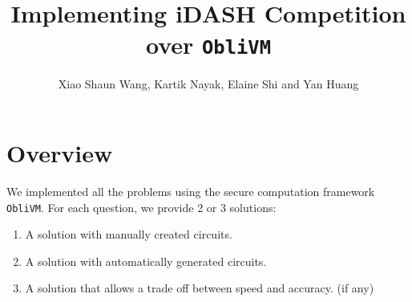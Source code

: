 \documentclass{article}
\title{Implementing iDASH Competition over {\tt ObliVM}}
\author{Xiao Shaun Wang, Kartik Nayak, Elaine Shi and Yan Huang}
\begin{document}
\maketitle
\section{Overview}
We implemented all the problems using the secure computation framework {\tt ObliVM}.
For each question, we provide 2 or 3 solutions:
\begin{enumerate}
\item A solution with manually created circuits.
\item A solution with automatically generated circuits.
\item A solution that allows a trade off between speed and accuracy. (if any)
\end{enumerate}


%
\end{document}
